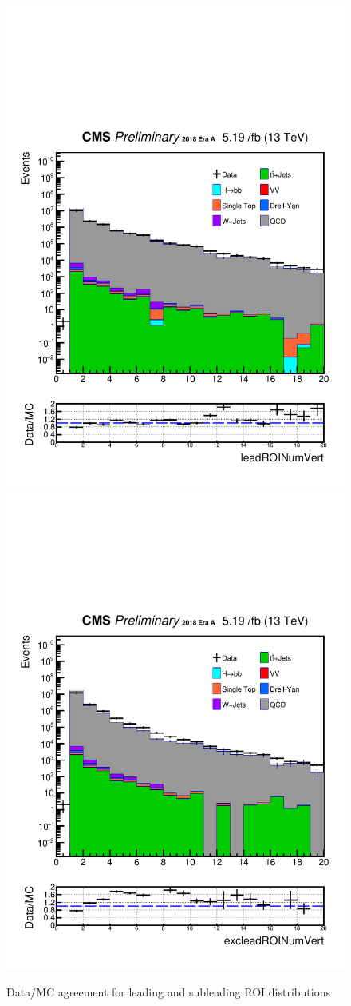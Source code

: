 \begin{figure}[h!]
  \label{fig:DataMCscore3}
  \centering
  \includegraphics[width=0.57\linewidth]{figs/Data_log_Oct6ANVars_MS-15_ctauS-10_leadROINumVert.pdf}
  \includegraphics[width=0.57\linewidth]{figs/Data_log_Oct6ANVars_MS-15_ctauS-10_excleadROINumVert.pdf}
  \caption{Data/MC agreement for leading and subleading ROI distributions}
\end{figure}


